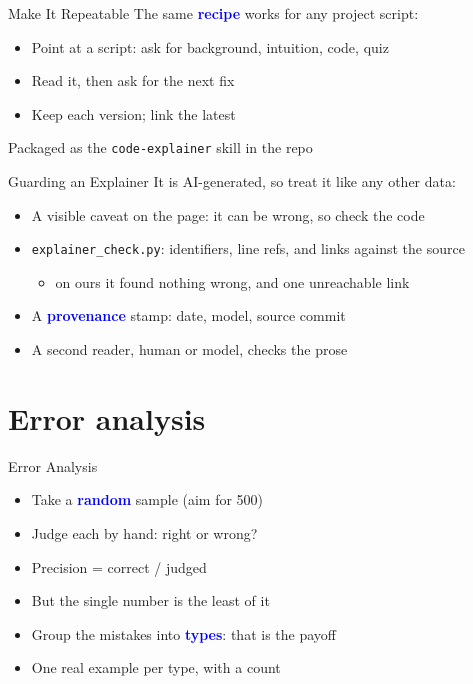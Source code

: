 \documentclass[xetex,aspectratio=169]{beamer}
\newcommand{\txx}[1]{\textbf{\textcolor{blue}{#1}}}
\begin{document}
\begin{frame}{Make It Repeatable}
  The same \txx{recipe} works for any project script:
  \begin{itemize}
  \item Point at a script: ask for background, intuition, code, quiz
  \item Read it, then ask for the next fix
  \item Keep each version; link the latest
  \end{itemize}
  \bigskip
  \centering\small Packaged as the \texttt{code-explainer} skill in the repo
\end{frame}

\begin{frame}{Guarding an Explainer}
  It is AI-generated, so treat it like any other data:
  \begin{itemize}
  \item A visible caveat on the page: it can be wrong, so check the code
  \item \texttt{explainer\_check.py}: identifiers, line refs, and links against the source
    \begin{itemize}
    \item on ours it found nothing wrong, and one unreachable link
    \end{itemize}
  \item A \txx{provenance} stamp: date, model, source commit
  \item A second reader, human or model, checks the prose
  \end{itemize}
\end{frame}

\section{Error analysis}

\begin{frame}{Error Analysis}
  \begin{itemize}
  \item Take a \txx{random} sample (aim for 500)
  \item Judge each by hand: right or wrong?
  \item Precision = correct / judged
  \item But the single number is the least of it
  \item Group the mistakes into \txx{types}: that is the payoff
  \item One real example per type, with a count
  \end{itemize}
\end{frame}
\end{document}
